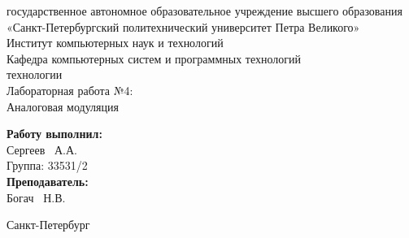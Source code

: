\documentclass[a4paper]{article}
\begin{document}

\begin{titlepage}	%

	\begin{center}		%

		 государственное автономное образовательное учреждение высшего образования «Санкт-Петербургский политехнический университет Петра Великого» \\
		\large Институт компьютерных наук и технологий \\
		\large Кафедра компьютерных систем и программных технологий\\[2cm]
		
	    \vfill
		 технологии\\[0.5cm] %
		\large Лабораторная работа №4:\\
		Аналоговая модуляция\\[4.8cm]

	\end{center}

	\begin{flushright} %
		\begin{minipage}{0.25\textwidth} %
			\begin{flushleft} %

				\large\textbf{Работу выполнил:}\\
				\large Сергеев ~А.А.\\
				\large {Группа:} 33531/2\\
				
				\large \textbf{Преподаватель:}\\
				\large Богач ~Н.В.\\

			\end{flushleft}
		\end{minipage}
	\end{flushright}
	
	\vfill %

	\begin{center}
	\large Санкт-Петербург\\
	\large \the\year %
	\end{center} %

\thispagestyle{empty} %
\end{titlepage} %
\vfill %
\end{document}
